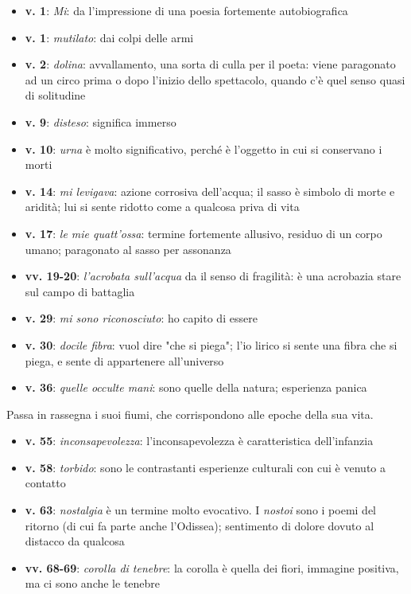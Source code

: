 \documentclass[a4paper, twoside, titlepage]{book}
\newcommand{\elenco}[1]{%
\begin{itemize}
#1
\end{itemize}}
\begin{document}
\elenco{
	\item \textbf{v. 1}: \textit{Mi}: da l'impressione di una poesia fortemente autobiografica
	\item \textbf{v. 1}: \textit{mutilato}: dai colpi delle armi
	\item \textbf{v. 2}: \textit{dolina}: avvallamento, una sorta di culla per il poeta: viene paragonato ad un circo prima o dopo l'inizio dello spettacolo, quando c'è quel senso quasi di solitudine
	\item \textbf{v. 9}: \textit{disteso}: significa immerso
	\item \textbf{v. 10}: \textit{urna} è molto significativo, perché è l'oggetto in cui si conservano i morti
	\item \textbf{v. 14}: \textit{mi levigava}: azione corrosiva dell'acqua; il sasso è simbolo di morte e aridità; lui si sente ridotto come a qualcosa priva di vita
	\item \textbf{v. 17}: \textit{le mie quatt'ossa}: termine fortemente allusivo, residuo di un corpo umano; paragonato al sasso per assonanza
	\item \textbf{vv. 19-20}: \textit{l'acrobata sull'acqua} da il senso di fragilità: è una acrobazia stare sul campo di battaglia
	\item \textbf{v. 29}: \textit{mi sono riconosciuto}: ho capito di essere
	\item \textbf{v. 30}: \textit{docile fibra}: vuol dire "che si piega"; l'io lirico si sente una fibra che si piega, e sente di appartenere all'universo
	\item \textbf{v. 36}: \textit{quelle occulte mani}: sono quelle della natura; esperienza panica}

Passa in rassegna i suoi fiumi, che corrispondono alle epoche della sua vita.

\elenco{
	\item \textbf{v. 55}: \textit{inconsapevolezza}: l'inconsapevolezza è caratteristica dell'infanzia
	\item \textbf{v. 58}: \textit{torbido}: sono le contrastanti esperienze culturali con cui è venuto a contatto
	\item \textbf{v. 63}: \textit{nostalgia} è un termine molto evocativo. I \textit{nostoi} sono i poemi del ritorno (di cui fa parte anche l'Odissea); sentimento di dolore dovuto al distacco da qualcosa
	\item \textbf{vv. 68-69}: \textit{corolla di tenebre}: la corolla è quella dei fiori, immagine positiva, ma ci sono anche le tenebre}
\end{document}
